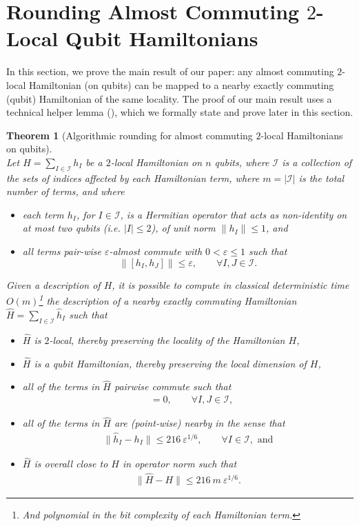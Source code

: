 \documentclass[a4paper,onecolumn,11pt]{quantumarticle}
\theoremstyle{plain}
\newtheorem{theorem}{Theorem}[section]
\newcommand{\eps}{\varepsilon}
\begin{document}
\section{Rounding Almost Commuting $2$-Local Qubit Hamiltonians}
In this section, we prove the main result of our paper: any almost commuting $2$-local Hamiltonian (on qubits) can be mapped to a nearby exactly commuting (qubit) Hamiltonian of the same locality. The proof of our main result uses a technical helper lemma (), which we formally state and prove later in this section.

\begin{theorem}[Algorithmic rounding for almost commuting $2$-local Hamiltonians on qubits]\label{thm:transforming-hamiltonian}\ \\
Let $H = \sum\limits_{I \in \mathcal{I}} h_{I}$ be a $2$-local 
Hamiltonian on $n$ qubits, where $\mathcal{I}$ is a collection of the sets of indices affected by each Hamiltonian term, where $m = |\mathcal{I}|$ is the total number of terms, and where
\begin{itemize}
    \item each term $h_{I}$, for $I \in \mathcal{I}$, is a Hermitian operator that acts as non-identity on at most two qubits (i.e. $|I| \leq 2$), of unit norm $\| h_I \| \leq 1$, and
    \item all terms pair-wise $\eps$-almost commute with $0 < \eps \leq 1$ such that
\[ \| [h_{I}, h_{J} ] \| \leq \eps, \quad\quad \forall I, J \in \mathcal{I}. \]
\end{itemize}
Given a description of $H$, it is possible to compute in classical deterministic time $O(m)$\footnote{And polynomial in the bit complexity of each Hamiltonian term.} the description of a nearby exactly commuting Hamiltonian $\hat{H} = \sum\limits_{I \in \mathcal{I}} \hat{h}_{I}$ such that 
\begin{itemize}
\item $\hat{H}$ is $2$-local, thereby preserving the locality of the Hamiltonian $H$,
\item $\hat{H}$ is a qubit Hamiltonian, thereby preserving the local dimension of $H$,
\item all of the terms in $\hat{H}$ pairwise commute such that
    \begin{align} 
[\hat{h}_{I}, \hat{h}_{J}] &= 0, \quad\quad \forall I, J \in \mathcal{I}, \label{eq:exact-commutation}
\end{align}
\item all of the terms in $\hat{H}$ are (point-wise) nearby in the sense that 
\begin{align}
\| \hat{h}_{I} - h_{I} \| \leq 216\ \eps^{1/6}, \quad\quad \forall I \in \mathcal{I}, \text{ and}\label{eq:overall-rounding-term-error}
\end{align}
\item $\hat{H}$ is overall close to $H$ in operator norm such that
\begin{align}
\|\hat{H} - H\| \leq 216\ m \ \eps^{1/6}.\label{eq:rounding-error}
\end{align}
\end{itemize}
\end{theorem}
\end{document}
